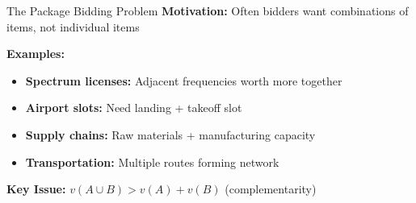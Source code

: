 \documentclass[xcolor={x11names}, aspectratio=169 ]{beamer}
\begin{document}
\begin{frame}{The Package Bidding Problem}
\textbf{Motivation:} Often bidders want combinations of items, not individual items

\textbf{Examples:}
\begin{itemize}
  \item \textbf{Spectrum licenses:} Adjacent frequencies worth more together
  \item \textbf{Airport slots:} Need landing + takeoff slot
  \item \textbf{Supply chains:} Raw materials + manufacturing capacity
  \item \textbf{Transportation:} Multiple routes forming network
\end{itemize}

\begin{center}
\end{center}

\textbf{Key Issue:} $v(A \cup B) > v(A) + v(B)$ (complementarity)
\end{frame}
\end{document}
